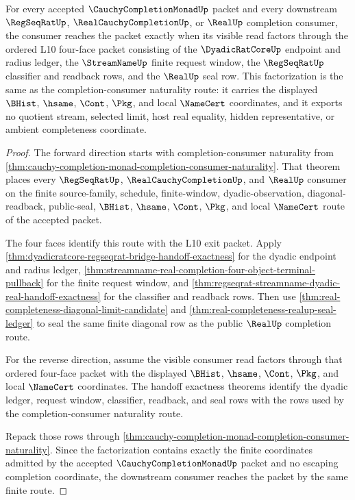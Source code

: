 \begin{theorem}
\label{thm:cauchy-completion-monad-l10-exit-finite-route-correspondence}
For every accepted $\CauchyCompletionMonadUp$ packet and every downstream $\RegSeqRatUp$, $\RealCauchyCompletionUp$, or $\RealUp$ completion consumer, the consumer reaches the packet exactly when its visible read factors through the ordered L10 four-face packet consisting of the $\DyadicRatCoreUp$ endpoint and radius ledger, the $\StreamNameUp$ finite request window, the $\RegSeqRatUp$ classifier and readback rows, and the $\RealUp$ seal row. This factorization is the same as the completion-consumer naturality route: it carries the displayed $\BHist$, $\hsame$, $\Cont$, $\Pkg$, and local $\NameCert$ coordinates, and it exports no quotient stream, selected limit, host real equality, hidden representative, or ambient completeness coordinate.
\end{theorem}
\begin{proof}
The forward direction starts with completion-consumer naturality from \autoref{thm:cauchy-completion-monad-completion-consumer-naturality}. That theorem places every $\RegSeqRatUp$, $\RealCauchyCompletionUp$, and $\RealUp$ consumer on the finite source-family, schedule, finite-window, dyadic-observation, diagonal-readback, public-seal, $\BHist$, $\hsame$, $\Cont$, $\Pkg$, and local $\NameCert$ route of the accepted packet.

The four faces identify this route with the L10 exit packet. Apply \autoref{thm:dyadicratcore-regseqrat-bridge-handoff-exactness} for the dyadic endpoint and radius ledger, \autoref{thm:streamname-real-completion-four-object-terminal-pullback} for the finite request window, and \autoref{thm:regseqrat-streamname-dyadic-real-handoff-exactness} for the classifier and readback rows. Then use \autoref{thm:real-completeness-diagonal-limit-candidate} and \autoref{thm:real-completeness-realup-seal-ledger} to seal the same finite diagonal row as the public $\RealUp$ completion route.

For the reverse direction, assume the visible consumer read factors through that ordered four-face packet with the displayed $\BHist$, $\hsame$, $\Cont$, $\Pkg$, and local $\NameCert$ coordinates. The handoff exactness theorems identify the dyadic ledger, request window, classifier, readback, and seal rows with the rows used by the completion-consumer naturality route.

Repack those rows through \autoref{thm:cauchy-completion-monad-completion-consumer-naturality}. Since the factorization contains exactly the finite coordinates admitted by the accepted $\CauchyCompletionMonadUp$ packet and no escaping completion coordinate, the downstream consumer reaches the packet by the same finite route.
\end{proof}


